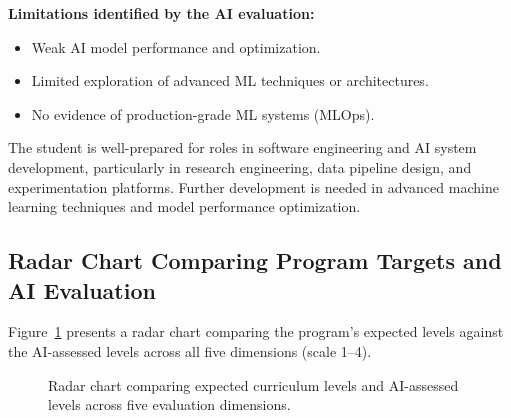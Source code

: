 \textbf{Limitations identified by the AI evaluation:}
\begin{itemize}
    \item Weak AI model performance and optimization.
    \item Limited exploration of advanced ML techniques or architectures.
    \item No evidence of production-grade ML systems (MLOps).
\end{itemize}

The student is well-prepared for roles in software engineering and AI system development,
particularly in research engineering, data pipeline design, and experimentation platforms.
Further development is needed in advanced machine learning techniques and model performance
optimization.

\subsection{Radar Chart Comparing Program Targets and AI Evaluation}
\label{subsec:radar-ai}

Figure~\ref{fig:radar-evaluation} presents a radar chart comparing the program's expected levels
against the AI-assessed levels across all five dimensions (scale 1--4).

\begin{figure}[h!]
\centering
{}
\caption{Radar chart comparing expected curriculum levels and AI-assessed levels across five evaluation dimensions.}
\label{fig:radar-evaluation}
\end{figure}
\FloatBarrier

